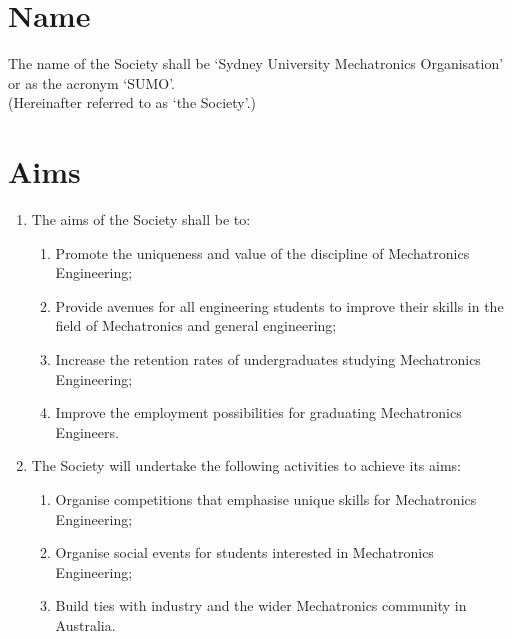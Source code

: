 \documentclass[11pt]{article}
\begin{document}


\begingroup 
\color{sumoblue}
\tableofcontents
\endgroup 

\pagebreak


\section{Name}
The name of the Society shall be ‘Sydney University Mechatronics Organisation’ or as the acronym ‘SUMO’. \\ (Hereinafter referred to as ‘the Society’.)


\section{Aims}
\begin{enumerate}[\thesection .1]
    \item The aims of the Society shall be to:
    \begin{enumerate}
        \item Promote the uniqueness and value of the discipline of Mechatronics Engineering;
        \item Provide avenues for all engineering students to improve their skills in the field of Mechatronics and general engineering;
        \item Increase the retention rates of undergraduates studying Mechatronics Engineering;
        \item Improve the employment possibilities for graduating Mechatronics Engineers.
    \end{enumerate}
    \item The Society will undertake the following activities to achieve its aims:
    \begin{enumerate}
        \item Organise competitions that emphasise unique skills for Mechatronics Engineering;
        \item Organise social events for students interested in Mechatronics Engineering;
        \item Build ties with industry and the wider Mechatronics community in Australia.
    \end{enumerate}
\end{enumerate}
\end{document}
